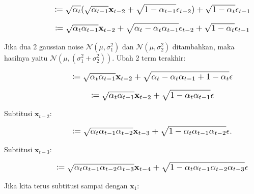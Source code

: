 \documentclass{article}
\newcommand*{\Scale}[2][4]{\scalebox{#1}{\ensuremath{#2}}}
\begin{document}
\begin{equation}
\Scale[1.2]{ \displaystyle
\hspace{4.75em} \coloneq \sqrt{\alpha_t} (\sqrt{\alpha_{t-1}} \textbf{x}_{t-2} + \sqrt{1-\alpha_{t-1}} \epsilon_{t-2}) + \sqrt{1-\alpha_t}\epsilon_{t-1} }
\end{equation}

\begin{equation}
\Scale[1.2]{ \displaystyle
\hspace{4.75em} \coloneq \sqrt{\alpha_t \alpha_{t-1}} \textbf{x}_{t-2} + \sqrt{\alpha_t - \alpha_t\alpha_{t-1}} \epsilon_{t-2} + \sqrt{1-\alpha_t}\epsilon_{t-1} }
\end{equation}

Jika dua 2 gaussian noise $ \mathscr{N}(\mu,\sigma_1^2) $ dan $ \mathscr{N}(\mu,\sigma_2^2) $ ditambahkan, maka hasilnya yaitu $ \mathscr{N}(\mu,(\sigma_1^2 + \sigma_2^2)) $. Ubah 2 term terakhir:

\begin{equation}
\Scale[1.2]{ \displaystyle
\hspace{4.75em} \coloneq \sqrt{\alpha_t \alpha_{t-1}} \textbf{x}_{t-2} + \sqrt{\alpha_t - \alpha_t\alpha_{t-1} + 1-\alpha_t} \epsilon }
\end{equation}

\begin{equation}
\Scale[1.2]{ \displaystyle
\hspace{4.75em} \coloneq \sqrt{\alpha_t \alpha_{t-1}} \textbf{x}_{t-2} + \sqrt{1-\alpha_t\alpha_{t-1}} \epsilon }
\end{equation}

Subtitusi $ \textbf{x}_{t-2} $:

\begin{equation}
\Scale[1.2]{ \displaystyle
\hspace{4.75em} \coloneq \sqrt{\alpha_t \alpha_{t-1} \alpha_{t-2}} \textbf{x}_{t-3} + \sqrt{1-\alpha_t\alpha_{t-1}\alpha_{t-2}} \epsilon. }
\end{equation}

Subtitusi $ \textbf{x}_{t-3} $:

\begin{equation}
\Scale[1.2]{ \displaystyle
\hspace{4.75em} \coloneq \sqrt{\alpha_t \alpha_{t-1} \alpha_{t-2} \alpha_{t-3}} \textbf{x}_{t-4} + \sqrt{1-\alpha_t\alpha_{t-1}\alpha_{t-2}\alpha_{t-3}} \epsilon }
\end{equation}

Jika kita terus subtitusi  sampai dengan $ \textbf{x}_{1} $:
\end{document}

